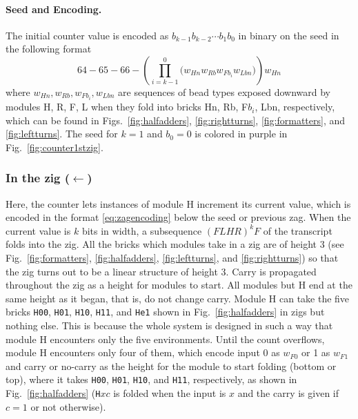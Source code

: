 \documentclass[runningheads]{llncs}
\begin{document}
\paragraph{Seed and Encoding.}
The initial counter value is encoded as $b_{k-1}b_{k-2} \cdots b_1b_0$ in binary on the seed in the following format
\begin{equation} \label{eq:zagencoding}
64{-}65{-}66{-}\left( \prod^0_{i = k-1} \bigl(  w_{Hn} w_{Rb} w_{Fb_i} w_{Lbn} \bigr) \right) w_{Hn}
\end{equation}
where $w_{Hn}, w_{Rb}, w_{Fb_i}, w_{Lbn}$ are sequences of bead types exposed downward by modules H, R, F, L when they fold into bricks Hn, Rb, F$b_i$, Lbn, respectively, which can be found in Figs.~\ref{fig:halfadders}, \ref{fig:rightturns}, \ref{fig:formatters}, and \ref{fig:leftturns}.
The seed for $k = 1$ and $b_0 = 0$ is colored in purple in Fig.~\ref{fig:counter1stzig}.

\subsubsection{In the zig ($\leftarrow$)} 
Here, the counter lets instances of module H increment its current value, which is encoded in the format \eqref{eq:zagencoding} below the seed or previous zag.
When the current value is $k$ bits in width, a subsequence $(FLHR)^kF$ of the transcript folds into the zig.
All the bricks which modules take in a zig are of height 3 (see Fig.~\ref{fig:formatters},  \ref{fig:halfadders}, \ref{fig:leftturns}, and \ref{fig:rightturns}) so that the zig turns out to be a linear structure of height 3.
Carry is propagated throughout the zig as a height for modules to start.
All modules but H end at the same height as it began, that is, do not change carry.
Module H can take the five bricks \texttt{H00}, \texttt{H01}, \texttt{H10}, \texttt{H11}, and \texttt{He1} shown in Fig.~\ref{fig:halfadders} in zigs but nothing else.
This is because the whole system is designed in such a way that module H encounters only the five environments.
Until the count overflows, module H encounters only four of them, which encode input 0 as $w_{F0}$ or 1 as $w_{F1}$ and carry or no-carry as the height for the module to start folding (bottom or top), where it takes \texttt{H00}, \texttt{H01}, \texttt{H10}, and \texttt{H11}, respectively, as shown in Fig.~\ref{fig:halfadders} (\texttt{H}$xc$ is folded when the input is $x$ and the carry is given if $c=1$ or not otherwise).
\end{document}
